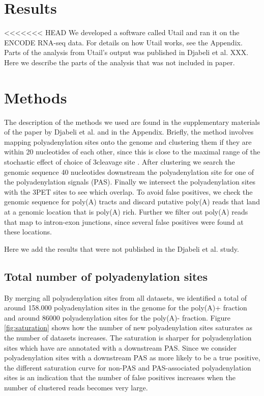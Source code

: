 \section{Results}
<<<<<<< HEAD
We developed a software called Utail and ran it on the ENCODE RNA-seq data.
For details on how Utail works, see the Appendix. Parts of the analysis from
Utail's output was published in Djabeli et al. XXX. Here we describe the parts
of the analysis that was not included in paper.

\section{Methods}
The description of the methods we used are found in the supplementary materials
of the paper by Djabeli et al. and in the Appendix. Briefly, the method
involves mapping polyadenylation sites onto the genome and clustering them if
they are within 20 nucleotides of each other, since this is close to the
maximal range of the stochastic effect of choice of 3\p cleavage site
\cite{tian_large-scale_2005}. After clustering we search the genomic sequence
40 nucleotides downstream the polyadenylation site for one of the
polyadenylation signals (PAS). Finally we intersect the polyadenylation sites
with the 3\p PET sites to see which overlap. To avoid false positives, we check
the genomic sequence for poly(A) tracts and discard putative poly(A) reads that
land at a genomic location that is poly(A) rich. Further we filter out poly(A)
reads that map to intron-exon junctions, since several false positives were
found at these locations.

Here we add the results that were not published in the Djabeli et al. study.

\subsection{Total number of polyadenylation sites}
By merging all polyadenylation sites from all datasets, we identified a total
of around 158.000 polyadenylation sites in the genome for the poly(A)+ fraction
and around 86000 polyadenylation sites for the poly(A)- fraction. Figure
\ref{fig:saturation} shows how the number of new polyadenylation sites
saturates as the number of datasets increases. The saturation is sharper for
polyadenylation sites which have are annotated with a downstream PAS. Since we
consider polyadenylation sites with a downstream PAS as more likely to be a
true positive, the different saturation curve for non-PAS and PAS-associated
polyadenylation sites is an indication that the number of false positives
increases when the number of clustered reads becomes very large. 

